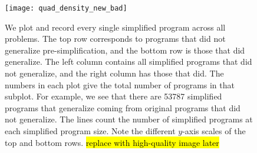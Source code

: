 


\begin{figure}[t] %
\centering
\texttt{[image: quad\_density\_new\_bad]}
\caption{We plot and record every single simplified program across all problems. The top row corresponds to programs that did not generalize pre-simplification, and the bottom row is those that did generalize. The left column contains all simplified programs that did not generalize, and the right column has those that did. The numbers in each plot give the total number of programs in that subplot. For example, we see that there are 53787 simplified programs that generalize coming from original programs that did not generalize. The lines count the number of simplified programs at each simplified program size. Note the different $y$-axis scales of the top and bottom rows. \hl{replace with high-quality image later}}
\label{fig:count:quad}
\end{figure}

%

